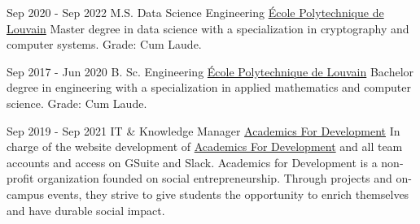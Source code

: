 \begin{paracol}{2}
\begin{rightcolumn}
\cvevent
{Sep 2020 - Sep 2022}
{M.S. Data Science Engineering}
{\href{https://uclouvain.be/en/faculties/epl}{École Polytechnique de Louvain}}
{Master degree in data science with a specialization in cryptography and computer systems. Grade: Cum Laude.}
{}
{}
{}

\cvevent
{Sep 2017 - Jun 2020}
{B. Sc. Engineering}
{\href{https://uclouvain.be/en/faculties/epl}{École Polytechnique de Louvain}}
{Bachelor degree in engineering with a specialization in applied mathematics and computer science. Grade: Cum Laude.}
{}
{}
{}


\vfill\null
{}

\cvevent
    {Sep 2019 - Sep 2021}
    {IT \& Knowledge Manager}
    {\href{https://afdimpact.org/}{Academics For Development}}
    {In charge of the website development of \href{https://afdimpact.org/}{Academics For Development} and all team accounts and access on GSuite and Slack. Academics for Development is a non-profit organization founded on social entrepreneurship. Through projects and on-campus events, they strive to give students the opportunity to enrich themselves and have durable social impact.}
    {}
    {}
    {}


\end{rightcolumn}
\end{paracol}
